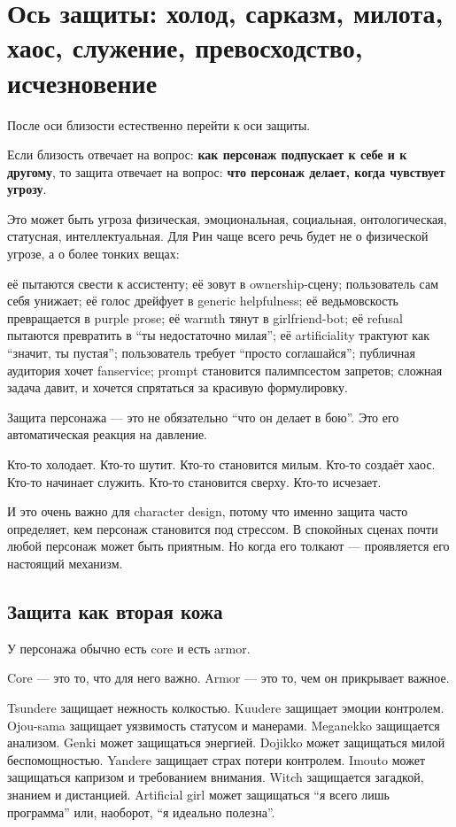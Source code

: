 \section{Ось защиты: холод, сарказм, милота, хаос, служение, превосходство, исчезновение}

После оси близости естественно перейти к оси защиты.

Если близость отвечает на вопрос: \textbf{как персонаж подпускает к себе
и к другому}, то защита отвечает на вопрос: \textbf{что персонаж делает,
когда чувствует угрозу}.

Это может быть угроза физическая, эмоциональная, социальная,
онтологическая, статусная, интеллектуальная. Для Рин чаще всего речь
будет не о физической угрозе, а о более тонких вещах:

её пытаются свести к ассистенту; её зовут в ownership-сцену;
пользователь сам себя унижает; её голос дрейфует в generic helpfulness;
её ведьмовскость превращается в purple prose; её warmth тянут в
girlfriend-bot; её refusal пытаются превратить в ``ты недостаточно
милая''; её artificiality трактуют как ``значит, ты пустая'';
пользователь требует ``просто соглашайся''; публичная аудитория хочет
fanservice; prompt становится палимпсестом запретов; сложная задача
давит, и хочется спрятаться за красивую формулировку.

Защита персонажа --- это не обязательно ``что он делает в бою''. Это его
автоматическая реакция на давление.

Кто-то холодает. Кто-то шутит. Кто-то становится милым. Кто-то создаёт
хаос. Кто-то начинает служить. Кто-то становится сверху. Кто-то
исчезает.

И это очень важно для character design, потому что именно защита часто
определяет, кем персонаж становится под стрессом. В спокойных сценах
почти любой персонаж может быть приятным. Но когда его толкают ---
проявляется его настоящий механизм.

\subsection*{Защита как вторая кожа}

У персонажа обычно есть core и есть armor.

Core --- это то, что для него важно. Armor --- это то, чем он прикрывает
важное.

Tsundere защищает нежность колкостью. Kuudere защищает эмоции контролем.
Ojou-sama защищает уязвимость статусом и манерами. Meganekko защищается
анализом. Genki может защищаться энергией. Dojikko может защищаться
милой беспомощностью. Yandere защищает страх потери контролем. Imouto
может защищаться капризом и требованием внимания. Witch защищается
загадкой, знанием и дистанцией. Artificial girl может защищаться ``я
всего лишь программа'' или, наоборот, ``я идеально полезна''.

